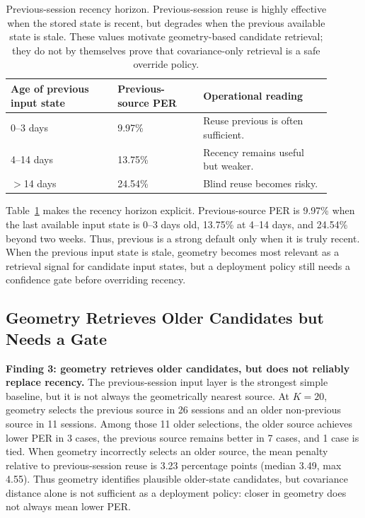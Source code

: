 \documentclass{article}
\begin{document}
\begin{table}[t]
\centering
\caption{Previous-session recency horizon. Previous-session reuse is highly effective when the stored state is recent, but degrades when the previous available state is stale. These values motivate geometry-based candidate retrieval; they do not by themselves prove that covariance-only retrieval is a safe override policy.}
\scriptsize
\setlength{\tabcolsep}{3pt}
\begin{tabular}{@{}p{0.30\linewidth}p{0.24\linewidth}p{0.36\linewidth}@{}}
\toprule
Age of previous input state & Previous-source PER & Operational reading \\
\midrule
0--3 days & 9.97\% & Reuse previous is often sufficient. \\
4--14 days & 13.75\% & Recency remains useful but weaker. \\
$>$14 days & 24.54\% & Blind reuse becomes risky. \\
\bottomrule
\end{tabular}
\label{tab:recency-horizon}
\end{table}

Table~\ref{tab:recency-horizon} makes the recency horizon explicit. Previous-source PER is 9.97\% when the last available input state is 0--3 days old, 13.75\% at 4--14 days, and 24.54\% beyond two weeks. Thus, previous is a strong default only when it is truly recent. When the previous input state is stale, geometry becomes most relevant as a retrieval signal for candidate input states, but a deployment policy still needs a confidence gate before overriding recency.

\subsection{Geometry Retrieves Older Candidates but Needs a Gate}
\textbf{Finding 3: geometry retrieves older candidates, but does not reliably replace recency.}
The previous-session input layer is the strongest simple baseline, but it is not always the geometrically nearest source. At $K=20$, geometry selects the previous source in 26 sessions and an older non-previous source in 11 sessions. Among those 11 older selections, the older source achieves lower PER in 3 cases, the previous source remains better in 7 cases, and 1 case is tied. When geometry incorrectly selects an older source, the mean penalty relative to previous-session reuse is 3.23 percentage points (median 3.49, max 4.55). Thus geometry identifies plausible older-state candidates, but covariance distance alone is not sufficient as a deployment policy: closer in geometry does not always mean lower PER.
\end{document}
